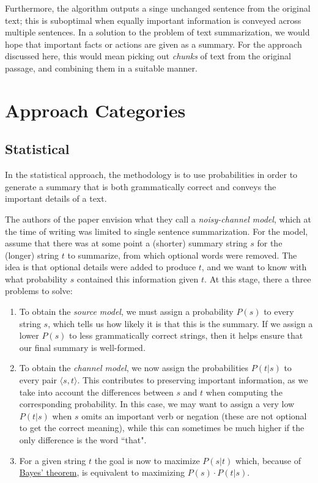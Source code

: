 Furthermore, the algorithm outputs a singe unchanged sentence from the original text; this is suboptimal when equally important information is conveyed across multiple sentences. In a solution to the problem of text summarization, we would hope that important facts or actions are given as a summary. For the approach discussed here, this would mean picking out \textit{chunks} of text from the original passage, and combining them in a suitable manner.

\section{Approach Categories}

\subsection{Statistical}

In the statistical approach, the methodology is to use probabilities in order to generate a summary that is both grammatically correct and conveys the important details of a text.

\mbox{}

The authors of the paper \cite{knight_statistics-based_2000} envision what they call a \textit{noisy-channel model}, which at the time of writing was limited to single sentence summarization. For the  model, assume that there was at some point a (shorter) summary string $s$ for the (longer) string $t$ to summarize, from which optional words were removed. The idea is that optional details were added to produce $t$, and we want to know with what probability $s$ contained this information given $t$. At this stage, there a three problems to solve:
\begin{enumerate}[noitemsep]
\item To obtain the \textit{source model}, we must assign a probability $P(s)$ to every string $s$, which tells us how likely it is that this is the summary. If we assign a lower $P(s)$ to less grammatically correct strings, then it helps ensure that our final summary is well-formed.
\item To obtain the \textit{channel model}, we now assign the probabilities $P(t \vert s)$ to every pair $\langle s, t \rangle$. This contributes to preserving important information, as we take into account the differences between $s$ and $t$ when computing the corresponding probability. In this case, we may want to assign a very low $P(t \vert s)$ when $s$ omits an important verb or negation (these are not optional to get the correct meaning), while this can sometimes be much higher if the only difference is the word ``that".
\item For a given string $t$ the goal is now to maximize $P(s \vert t)$ which, because of \href{https://www.investopedia.com/terms/b/bayes-theorem.asp}{Bayes' theorem}, is equivalent to maximizing $P(s) \cdot P(t \vert s)$.
\end{enumerate}

